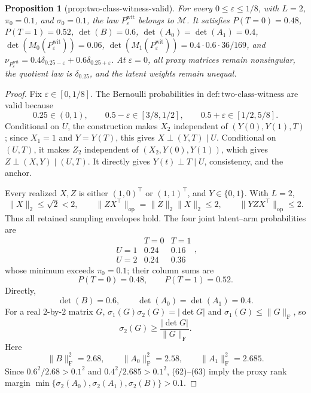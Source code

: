 \documentclass{article}
\newtheorem{proposition}{Proposition}
\begin{document}
\begin{proposition}[prop:two-class-witness-valid]\label{prop:two-class-witness-valid}
For every \(0\le\varepsilon\le1/8\), with \(L=2\), \(\pi_0=0.1\), and \(\sigma_0=0.1\), the law \(P_{\varepsilon}^{\mathrm{wit}}\) belongs to \(\mathcal M\). It satisfies \(P(T=0)=0.48\), \(P(T=1)=0.52\), \(\det(B)=0.6\), \(\det(A_0)=\det(A_1)=0.4\), \(\det(M_0(P_{\varepsilon}^{\mathrm{wit}}))=0.06\), \(\det(M_1(P_{\varepsilon}^{\mathrm{wit}}))=0.4\cdot0.6\cdot36/169\), and \(\nu_{P_{\varepsilon}^{\mathrm{wit}}}=0.4\delta_{0.25-\varepsilon}+0.6\delta_{0.25+\varepsilon}\). At \(\varepsilon=0\), all proxy matrices remain nonsingular, the quotient law is \(\delta_{0.25}\), and the latent weights remain unequal.
\end{proposition}
\begin{proof}
Fix \(\varepsilon\in[0,1/8]\).  The Bernoulli probabilities in \(\mathrm{def:two\text{-}class\text{-}witness}\) are valid because
\[
0.25\in(0,1),\qquad 0.5-\varepsilon\in[3/8,1/2],\qquad
0.5+\varepsilon\in[1/2,5/8].                                                  \tag{58}
\]
Conditional on \(U\), the construction makes \(X_2\) independent of \((Y(0),Y(1),T)\); since \(X_1=1\) and \(Y=Y(T)\), this gives \(X\perp(Y,T)\mid U\).  Conditional on \((U,T)\), it makes \(Z_2\) independent of \((X_2,Y(0),Y(1))\), which gives \(Z\perp(X,Y)\mid(U,T)\).  It directly gives \(Y(t)\perp T\mid U\), consistency, and the anchor.

Every realized \(X,Z\) is either \((1,0)^\top\) or \((1,1)^\top\), and \(Y\in\{0,1\}\).  With \(L=2\),
\[
\lVert X\rVert_2\le\sqrt2<2,\qquad
\lVert ZX^\top\rVert_{\mathrm{op}}=\lVert Z\rVert_2\lVert X\rVert_2\le2,
\qquad \lVert YZX^\top\rVert_{\mathrm{op}}\le2.                            \tag{59}
\]
Thus all retained sampling envelopes hold.  The four joint latent--arm probabilities are
\[
\begin{array}{c|cc}
 &T=0&T=1\\ \hline
U=1&0.24&0.16\\
U=2&0.24&0.36
\end{array},                                                                  \tag{60}
\]
whose minimum exceeds \(\pi_0=0.1\); their column sums are
\[
P(T=0)=0.48,\qquad P(T=1)=0.52.                                                \tag{61}
\]
Directly,
\[
\det(B)=0.6,\qquad \det(A_0)=\det(A_1)=0.4.                                  \tag{62}
\]
For a real \(2\)-by-\(2\) matrix \(G\), \(\sigma_1(G)\sigma_2(G)=|\det G|\) and \(\sigma_1(G)\le\lVert G\rVert_{\mathrm F}\), so
\[
\sigma_2(G)\ge\frac{|\det G|}{\lVert G\rVert_{\mathrm F}}.               \tag{63}
\]
Here
\[
\lVert B\rVert_{\mathrm F}^2=2.68,\qquad
\lVert A_0\rVert_{\mathrm F}^2=2.58,\qquad
\lVert A_1\rVert_{\mathrm F}^2=2.685.
\]
Since \(0.6^2/2.68>0.1^2\) and \(0.4^2/2.685>0.1^2\), (62)--(63) imply the proxy rank margin \(\min\{\sigma_2(A_0),\sigma_2(A_1),\sigma_2(B)\}>0.1\).


\end{proof}
\end{document}
